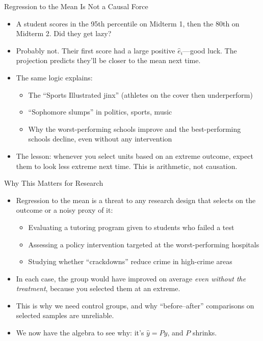 \documentclass[aspectratio=169, handout]{beamer}
\numberwithin{equation}{section}
\begin{document}
\begin{frame}{Regression to the Mean Is Not a Causal Force}
\begin{itemize}
\item A student scores in the 95th percentile on Midterm 1, then the 80th on Midterm 2. Did they get lazy?\pause
\item Probably not. Their first score had a large positive $\hat{e}_i$---good luck. The projection predicts they'll be closer to the mean next time.\pause
\item The same logic explains:
\begin{itemize}
\item The ``Sports Illustrated jinx'' (athletes on the cover then underperform)
\item ``Sophomore slumps'' in politics, sports, music
\item Why the worst-performing schools improve and the best-performing schools decline, even without any intervention
\end{itemize}\pause
\item The lesson: whenever you select units based on an extreme outcome, expect them to look less extreme next time. This is arithmetic, not causation.
\end{itemize}
\end{frame}

\begin{frame}{Why This Matters for Research}
\begin{itemize}
\item Regression to the mean is a threat to any research design that selects on the outcome or a noisy proxy of it:\pause
\begin{itemize}
\item Evaluating a tutoring program given to students who failed a test
\item Assessing a policy intervention targeted at the worst-performing hospitals
\item Studying whether ``crackdowns'' reduce crime in high-crime areas
\end{itemize}\pause
\item In each case, the group would have improved on average \emph{even without the treatment}, because you selected them at an extreme.\pause
\item This is why we need control groups, and why ``before--after'' comparisons on selected samples are unreliable.
\item We now have the algebra to see why: it's $\hat{y} = Py$, and $P$ shrinks.
\end{itemize}
\end{frame}
\end{document}
